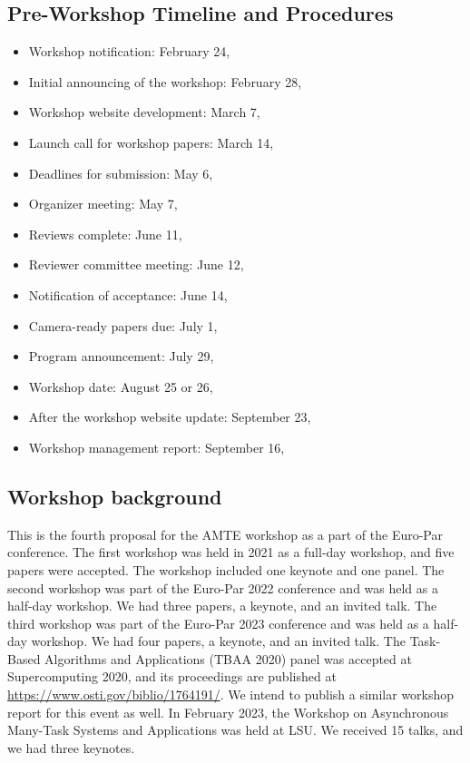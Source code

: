 \documentclass{article}
\begin{document}
\subsection*{Pre-Workshop Timeline and Procedures}
\begin{itemize}
    \item Workshop notification: February 24, \the\year{}
    \item Initial announcing of the workshop: February 28, \the\year{}
    \item Workshop website development: March 7, \the\year{}
    \item Launch call for workshop papers: March 14, \the\year{}
    \item Deadlines for submission: May 6, \the\year{}
    \item Organizer meeting: May 7, \the\year{}
    \item Reviews complete: June 11, \the\year{}
    \item Reviewer committee meeting: June 12, \the\year{}
    \item Notification of acceptance: June 14, \the\year{}
    \item Camera-ready papers due: July 1, \the\year{}
    \item Program announcement: July 29, \the\year{}
    \item Workshop date: August 25 or 26, \the\year{}
    \item After the workshop website update: September 23, \the\year{}
    \item Workshop management report: September 16, \the\year{}
\end{itemize}

\subsection*{Workshop background}
This is the fourth proposal for the AMTE workshop as a part of the Euro-Par conference. The first workshop was held in 2021 as a full-day workshop, and five papers were accepted. The workshop included one keynote and one panel. The second workshop was part of the Euro-Par 2022 conference and was held as a half-day workshop. We had three papers, a keynote, and an invited talk. The third workshop was part of the Euro-Par 2023 conference and was held as a half-day workshop. We had four papers, a keynote, and an invited talk. The Task-Based Algorithms and Applications (TBAA 2020) panel was accepted at Supercomputing 2020, and its proceedings are published at \url{https://www.osti.gov/biblio/1764191/}. We intend to publish a similar workshop report for this event as well. In February 2023, the Workshop on Asynchronous Many-Task Systems and Applications was held at LSU. We received 15 talks, and we had three keynotes.
\end{document}
